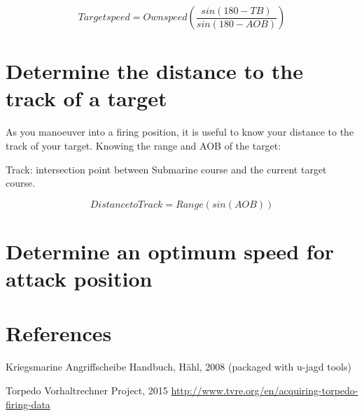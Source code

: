 \documentclass{article}
\begin{document}
$$Target speed = Own speed \left( \frac{sin(180-TB)}{sin (180-AOB)} \right)$$

\section{Determine the distance to the track of a target}

As you manoeuver into a firing position, it is useful to know your distance to the track of your target. Knowing the range and AOB of the target:

Track: intersection point between Submarine course and the current target course.

$$Distance to Track = Range \left( sin(AOB) \right)$$

\section{Determine an optimum speed for attack position}


\pagebreak
\section{References}

Kriegsmarine Angriffscheibe Handbuch, H{\"a}hl, 2008 (packaged with u-jagd tools)

Torpedo Vorhaltrechner Project, 2015
\url{http://www.tvre.org/en/acquiring-torpedo-firing-data}
\end{document}
